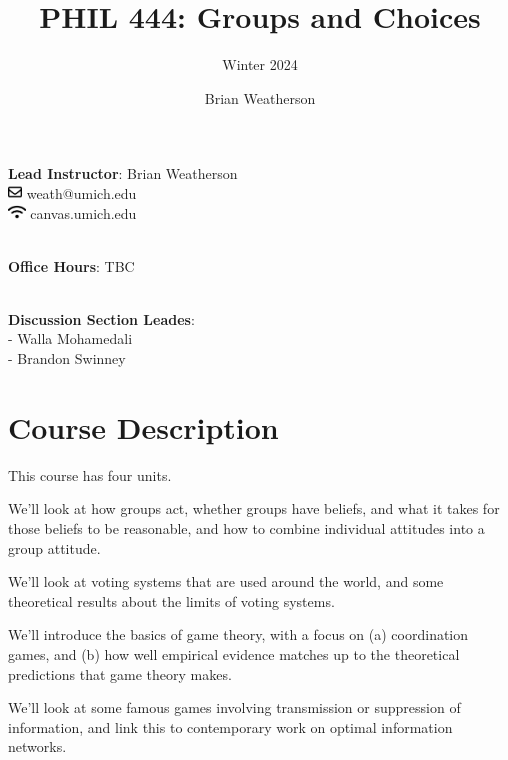 \documentclass[
  12pt,
  letterpaper,
  DIV=11,
  numbers=noendperiod]{scrartcl}
\title{PHIL 444: Groups and Choices}
\subtitle{Winter 2024}
\author{Brian Weatherson}
\date{}
\providecommand{\tightlist}{%
  \setlength{\itemsep}{0pt}\setlength{\parskip}{0pt}}\usepackage{longtable,booktabs,array}
\begin{document}
\maketitle

\textbf{Lead Instructor}: Brian Weatherson\\
\includegraphics[width=1em,height=1em]{syllabus-phil444-w24_files/figure-pdf/fa-icon-a7ff419e70980f9f1a65816048d94526.pdf}
weath@umich.edu\\
\includegraphics[width=1.25em,height=1em]{syllabus-phil444-w24_files/figure-pdf/fa-icon-69b5e588a8cebb8cb21405167a7066e5.pdf}
canvas.umich.edu\\
\strut \\
\textbf{Office Hours}: TBC\\
\strut \\
\textbf{Discussion Section Leades}:\\
- Walla Mohamedali\\
- Brandon Swinney

\section{Course Description}\label{course-description}

This course has four units.

\begin{description}
\tightlist
\item[Group Attitudes]
We'll look at how groups act, whether groups have beliefs, and what it
takes for those beliefs to be reasonable, and how to combine individual
attitudes into a group attitude.
\item[Voting]
We'll look at voting systems that are used around the world, and some
theoretical results about the limits of voting systems.
\item[Games and Coordination]
We'll introduce the basics of game theory, with a focus on (a)
coordination games, and (b) how well empirical evidence matches up to
the theoretical predictions that game theory makes.
\item[Information Networks]
We'll look at some famous games involving transmission or suppression of
information, and link this to contemporary work on optimal information
networks.
\end{description}
\end{document}
